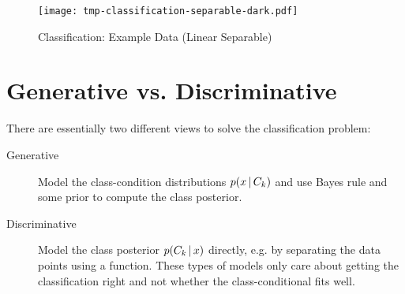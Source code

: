 	\begin{figure}
		\centering
		\texttt{[image: tmp-classification-separable-dark.pdf]}
		\caption{Classification: Example Data (Linear Separable)}
		\label{fig:classificationExampleSeparable}
	\end{figure}

	\section{Generative vs. Discriminative}
		There are essentially two different views to solve the classification problem:
		\begin{description}
			\item[Generative] Model the class-condition distributions \( p(x \,\vert\, C_k) \) and use Bayes rule and some prior to compute the class posterior.
			\item[Discriminative] Model the class posterior \( p(C_k \,\vert\, x) \) directly, e.g. by separating the data points using a function. These types of models only care about getting the classification right and not whether the class-conditional fits well.
		\end{description}

